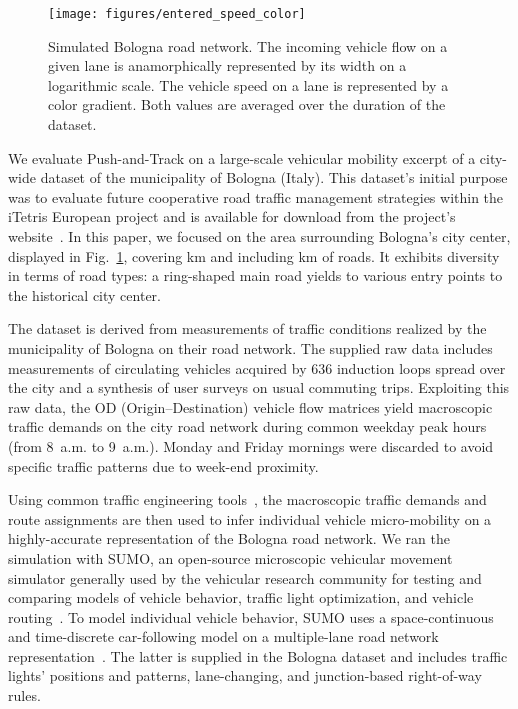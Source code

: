 \documentclass[preprint]{elsarticle}
\begin{document}
\begin{figure}
    \centering
    \texttt{[image: figures/entered\_speed\_color]}
    \caption{Simulated Bologna road network. The incoming vehicle flow on a given lane is anamorphically represented by its width on a logarithmic scale. The vehicle speed on a lane is represented by a color gradient. Both values are averaged over the duration of the dataset.}
    \label{fig_map}
\end{figure}

We evaluate Push-and-Track on a large-scale vehicular mobility excerpt of a city-wide dataset of the municipality of Bologna (Italy). This dataset's initial purpose was to evaluate future cooperative road traffic management strategies within the iTetris European project and is available for download from the project's website~\cite{itetris}. In this paper, we focused on the area surrounding Bologna's city center, displayed in Fig.~\ref{fig_map}, covering  km and including  km of roads. It exhibits diversity in terms of road types: a ring-shaped main road yields to various entry points to the historical city center.

The dataset is derived from measurements of traffic conditions realized by the municipality of Bologna on their road network. The supplied raw data includes measurements of circulating vehicles acquired by 636 induction loops spread over the city and a synthesis of user surveys on usual commuting trips. Exploiting this raw data, the OD (Origin--Destination) vehicle flow matrices yield macroscopic traffic demands on the city road network during common weekday peak hours (from 8~a.m. to 9~a.m.). Monday and Friday mornings were discarded to avoid specific traffic patterns due to week-end proximity.

Using common traffic engineering tools~\cite{vissim}, the macroscopic traffic demands and route assignments are then used to infer individual vehicle micro-mobility on a highly-accurate representation of the Bologna road network. We ran the simulation with SUMO, an open-source microscopic vehicular movement simulator generally used by the vehicular research community for testing and comparing models of vehicle behavior, traffic light optimization, and vehicle routing~\cite{krajzewicz2002sumo}. To model individual vehicle behavior, SUMO uses a space-continuous and time-discrete car-following model on a multiple-lane road network representation~\cite{zpr98-319}. The latter is supplied in the Bologna dataset and includes traffic lights' positions and patterns, lane-changing, and junction-based right-of-way rules.
\end{document}
